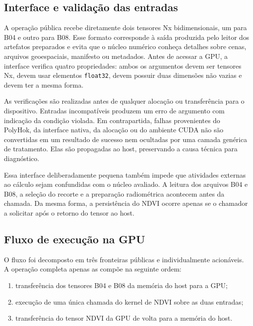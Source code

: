 \documentclass[tcc,capa]{texufpel}
\begin{document}
\subsection{Interface e validação das entradas}

A operação pública recebe diretamente dois tensores Nx bidimensionais, um para B04
e outro para B08. Esse formato corresponde à saída produzida pelo leitor dos
artefatos preparados e evita que o núcleo numérico conheça detalhes sobre cenas,
arquivos geoespaciais, manifesto ou metadados. Antes de acessar a GPU, a interface
verifica quatro propriedades: ambos os argumentos devem ser tensores Nx, devem usar
elementos \texttt{float32}, devem possuir duas dimensões não vazias e devem ter a
mesma forma.

As verificações são realizadas antes de qualquer alocação ou transferência para o
dispositivo. Entradas incompatíveis produzem um erro de argumento com indicação da
condição violada. Em contrapartida, falhas provenientes do PolyHok, da interface
nativa, da alocação ou do ambiente CUDA não são convertidas em um resultado de
sucesso nem ocultadas por uma camada genérica de tratamento. Elas são propagadas ao
host, preservando a causa técnica para diagnóstico.

Essa interface deliberadamente pequena também impede que atividades externas ao
cálculo sejam confundidas com o núcleo avaliado. A leitura dos arquivos B04 e B08,
a seleção do recorte e a preparação radiométrica acontecem antes da chamada. Da
mesma forma, a persistência do NDVI ocorre apenas se o chamador a solicitar após o
retorno do tensor ao host.

\subsection{Fluxo de execução na GPU}

O fluxo foi decomposto em três fronteiras públicas e individualmente acionáveis. A
operação completa apenas as compõe na seguinte ordem:

\begin{enumerate}
  \item transferência dos tensores B04 e B08 da memória do host para a GPU;
  \item execução de uma única chamada do kernel de NDVI sobre as duas entradas;
  \item transferência do tensor NDVI da GPU de volta para a memória do host.
\end{enumerate}
\end{document}
